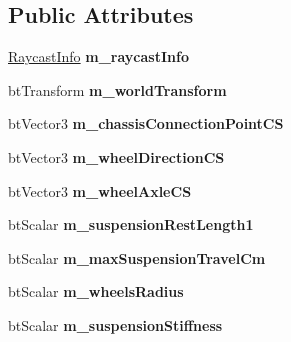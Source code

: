 \subsection*{Public Attributes}
\begin{DoxyCompactItemize}
\item 
\hypertarget{structbt_wheel_info_ae628d995c45e7475589f655f95acd301}{\hyperlink{structbt_wheel_info_1_1_raycast_info}{Raycast\+Info} {\bfseries m\+\_\+raycast\+Info}}\label{structbt_wheel_info_ae628d995c45e7475589f655f95acd301}

\item 
\hypertarget{structbt_wheel_info_acdf5fe66004c026e297d96a371ebc598}{bt\+Transform {\bfseries m\+\_\+world\+Transform}}\label{structbt_wheel_info_acdf5fe66004c026e297d96a371ebc598}

\item 
\hypertarget{structbt_wheel_info_a9f687488242322590a95687868d8a411}{bt\+Vector3 {\bfseries m\+\_\+chassis\+Connection\+Point\+C\+S}}\label{structbt_wheel_info_a9f687488242322590a95687868d8a411}

\item 
\hypertarget{structbt_wheel_info_a5b9feca7a6d901e0418129e565f47623}{bt\+Vector3 {\bfseries m\+\_\+wheel\+Direction\+C\+S}}\label{structbt_wheel_info_a5b9feca7a6d901e0418129e565f47623}

\item 
\hypertarget{structbt_wheel_info_aabf212ac6dd020d9ded6fcb647c35523}{bt\+Vector3 {\bfseries m\+\_\+wheel\+Axle\+C\+S}}\label{structbt_wheel_info_aabf212ac6dd020d9ded6fcb647c35523}

\item 
\hypertarget{structbt_wheel_info_a65aeca58e428598b01386e1794de28c9}{bt\+Scalar {\bfseries m\+\_\+suspension\+Rest\+Length1}}\label{structbt_wheel_info_a65aeca58e428598b01386e1794de28c9}

\item 
\hypertarget{structbt_wheel_info_a81c29a33875c0db7cbe17481d030d905}{bt\+Scalar {\bfseries m\+\_\+max\+Suspension\+Travel\+Cm}}\label{structbt_wheel_info_a81c29a33875c0db7cbe17481d030d905}

\item 
\hypertarget{structbt_wheel_info_a96d9d2f181b20598bdaa58cb79e65b0f}{bt\+Scalar {\bfseries m\+\_\+wheels\+Radius}}\label{structbt_wheel_info_a96d9d2f181b20598bdaa58cb79e65b0f}

\item 
\hypertarget{structbt_wheel_info_a53b2e9061f96d3002137870fc1fdd419}{bt\+Scalar {\bfseries m\+\_\+suspension\+Stiffness}}\label{structbt_wheel_info_a53b2e9061f96d3002137870fc1fdd419}


\end{DoxyCompactItemize}
